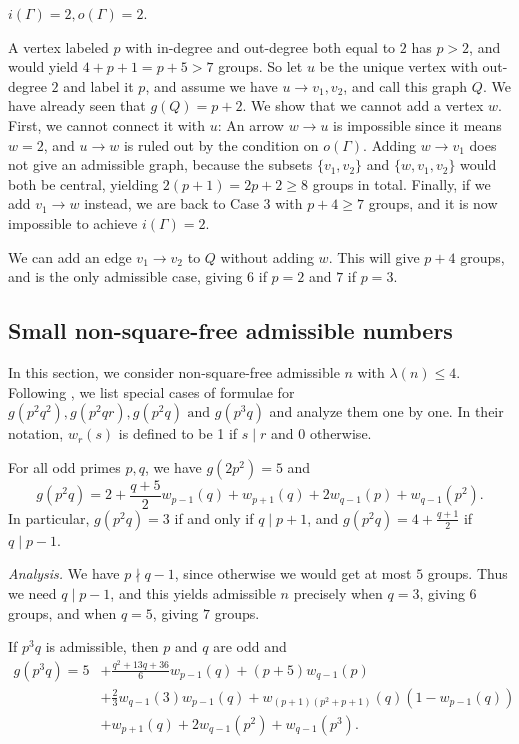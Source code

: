  $i(\Gamma) = 2, o(\Gamma) = 2$.

A vertex labeled $p$ with in-degree and out-degree both equal to $2$ has $p > 2$, and would yield $4 + p + 1 = p + 5 > 7$ groups.
So let $u$ be the unique vertex with out-degree $2$ and label it $p$, and assume we have $u \rightarrow v_1, v_2$, and call this graph $Q$.
We have already seen that $g(Q) = p + 2$.
We show that we cannot add a vertex $w$.
First, we cannot connect it with $u$: An arrow $w \rightarrow u$ is impossible since it means $w = 2$, and $u \rightarrow w$ is ruled out by the condition on $o(\Gamma)$.
Adding $w \rightarrow v_1$ does not give an admissible graph, because the subsets $\{v_1, v_2\}$ and $\{w, v_1, v_2\}$ would both be central, yielding $2(p + 1) = 2p + 2 \ge 8$ groups in total.
Finally, if we add $v_1 \rightarrow w$ instead, we are back to Case $3$ with $p + 4 \ge 7$ groups, and it is now impossible to achieve $i(\Gamma) = 2$.

We can add an edge $v_1 \rightarrow v_2$ to $Q$ without adding $w$.
This will give $p + 4$ groups, and is the only admissible case, giving $6$ if $p = 2$ and $7$ if $p = 3$.

\subsection{Small non-square-free admissible numbers}
In this section, we consider non-square-free admissible $n$ with $\lambda(n) \le 4$.
Following {\cite{bettinafour1}}, we list special cases of formulae for $g(p^2 q^2), g(p^2 q r), g(p^2 q) \text{ and } g(p^3 q)$ and analyze them one by one.
In their notation, $w_r(s)$ is defined to be 1 if $s \mid r$ and 0 otherwise.


\begin{eufact}
	For all odd primes $p, q$, we have $g(2p^2) = 5$ and \[g(p^2 q) = 2 + \frac{q + 5}{2} w_{p - 1}(q) + w_{p + 1}(q) + 2w_{q - 1}(p) + w_{q - 1}(p^2).\] In particular, $g(p^2 q) = 3$ if and only if $q \mid p + 1$, and $g(p^2 q) = 4 + \frac{q + 1}{2}$ if $q \mid p - 1$.
\end{eufact}

\textit{Analysis.} We have $p \nmid q - 1$, since otherwise we would get at most $5$ groups.
Thus we need $q \mid p - 1$, and this yields admissible $n$ precisely when $q = 3$, giving $6$ groups, and when $q = 5$, giving $7$ groups.

\begin{eufact}
	If $p^3 q$ is admissible, then $p$ and $q$ are odd and
	$$\begin{aligned}
		g(p^3 q) = 5 &+ \frac{q^2 + 13q + 36}{6} w_{p - 1}(q) + (p + 5) w_{q - 1}(p) \\
		&+ \frac{2}{3} w_{q - 1}(3)w_{p - 1}(q) + w_{(p + 1)(p^2 + p + 1)}(q) (1 - w_{p - 1}(q)) \\
		&+ w_{p + 1}(q) + 2 w_{q - 1}(p^2) + w_{q - 1}(p^3).
	\end{aligned}$$
\end{eufact}

